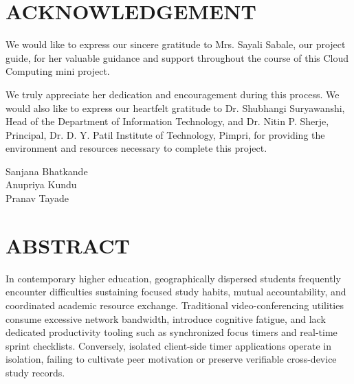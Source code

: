 \documentclass[12pt,a4paper,openany]{report}
\newcommand{\guidename}{Mrs. Sayali Sabale}
\newcommand{\hodname}{Dr. Shubhangi Suryawanshi}
\newcommand{\principalname}{Dr. Nitin P. Sherje}
\begin{document}
\pagestyle{plain}
\chapter*{ACKNOWLEDGEMENT}
\justifying
 
We would like to express our sincere gratitude to \guidename, our project guide, for her valuable guidance and support throughout the course of this Cloud Computing mini project.
 
We truly appreciate her dedication and encouragement during this process. We would also like to express our heartfelt gratitude to \hodname, Head of the Department of Information Technology, and \principalname, Principal, Dr. D. Y. Patil Institute of Technology, Pimpri, for providing the environment and resources necessary to complete this project.
 
\begin{flushright}
Sanjana Bhatkande\\
Anupriya Kundu\\
Pranav Tayade\\
\end{flushright}
 
\clearpage
\chapter*{ABSTRACT}
\justifying
In contemporary higher education, geographically dispersed students frequently encounter difficulties sustaining focused study habits, mutual accountability, and coordinated academic resource exchange. Traditional video-conferencing utilities consume excessive network bandwidth, introduce cognitive fatigue, and lack dedicated productivity tooling such as synchronized focus timers and real-time sprint checklists. Conversely, isolated client-side timer applications operate in isolation, failing to cultivate peer motivation or preserve verifiable cross-device study records. 
\end{document}
